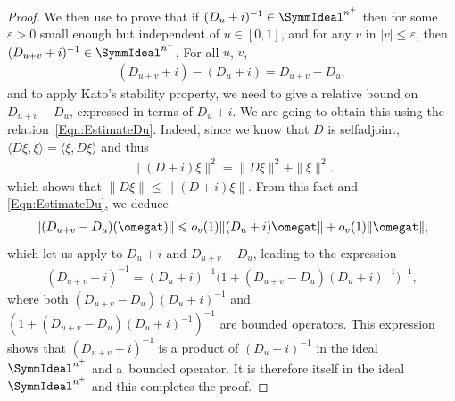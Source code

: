 \begin{proof}
We then use \cite[Theorem~1.16, p.~196]{Kato} to prove that if $(D_u + i)^{-1} \in \SymmIdeal^{n^+}$ then for some $\varepsilon > 0$ small enough but independent of $u \in [0,1]$, and for any $v$ in $|v| \leqslant \varepsilon$, then $(D_{u+v} + i)^{-1} \in \SymmIdeal^{n^+}$. For all $u$, $v$,
\begin{gather*}
(D_{u+v} + i ) - (D_u + i) = D_{u+v} - D_u,
\end{gather*}
and to apply Kato's stability property, we need to give a relative bound on $D_{u+v} - D_u$, expressed in terms of $D_u +i$. We are going to obtain this using the relation~\eqref{Eqn:EstimateDu}. Indeed, since we know that $D$ is selfadjoint, $\langle D \xi, \xi \rangle = \langle \xi, D \xi \rangle $ and thus
\begin{gather*}
\| (D + i) \xi \|^2 = \| D \xi \|^2 + \| \xi \|^2.
\end{gather*}
which shows that $\| D \xi \| \leqslant \| (D + i) \xi \|$. From this fact and \eqref{Eqn:EstimateDu}, we deduce
\begin{gather*}
\| (D_{u+v} - D_u)(\omegat) \| \leqslant o_v(1) \| (D_u +i) \omegat \| + o_v(1) \| \omegat \|,
\end{gather*}
which let us apply \cite[Theorem~1.16, p.~196]{Kato} to $D_u +i$ and $D_{u+v} - D_u$, leading to the expression
\begin{gather*}
(D_{u+v} + i)^{-1} = (D_u + i)^{-1} \big(1 + (D_{u+v} - D_u)(D_u +i)^{-1}\big)^{-1},
\end{gather*}
where both $(D_{u+v} - D_u)(D_u +i)^{-1}$ and $(1 + (D_{u+v} - D_u)(D_u +i)^{-1})^{-1}$ are bounded operators. This expression shows that $(D_{u+v} + i)^{-1}$ is a product of $(D_u + i)^{-1}$ in the ideal $\SymmIdeal^{n^+}$ and a~bounded operator. It is therefore itself in the ideal $\SymmIdeal^{n^+}$ and this completes the proof.
\end{proof}
